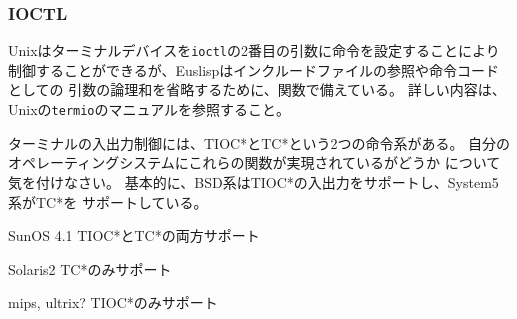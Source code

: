 \subsubsection{IOCTL}
Unixはターミナルデバイスを{\tt ioctl}の2番目の引数に命令を設定することにより
制御することができるが、Euslispはインクルードファイルの参照や命令コードとしての
引数の論理和を省略するために、関数で備えている。
詳しい内容は、Unixの{\tt  termio}のマニュアルを参照すること。

ターミナルの入出力制御には、TIOC*とTC*という2つの命令系がある。
自分のオペレーティングシステムにこれらの関数が実現されているがどうか
について気を付けなさい。
基本的に、BSD系はTIOC*の入出力をサポートし、System5系がTC*を
サポートしている。
\begin{description}
\item{SunOS 4.1} TIOC*とTC*の両方サポート
\item{Solaris2} TC*のみサポート
\item{mips, ultrix?} TIOC*のみサポート
\end{description}
